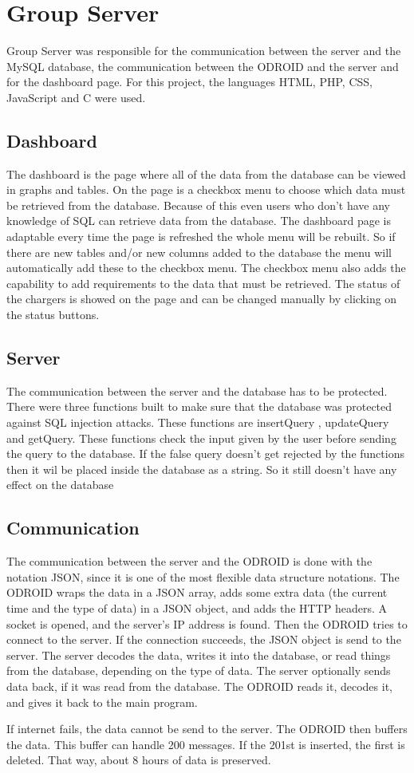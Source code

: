 \section{Group Server}\label{Server}
Group Server was responsible for the communication between the server and the MySQL database, the communication between the ODROID and the server and for the dashboard page. For this project, the languages HTML, PHP, CSS, JavaScript and C were used.
\subsection{Dashboard}
The dashboard is the page where all of the data from the database can be viewed in graphs and tables. On the page is a checkbox menu to choose which data must be retrieved from the database. Because of this even users who don’t have any knowledge of SQL can retrieve data from the database. The dashboard page is adaptable every time the page is refreshed the whole menu will be rebuilt. So if there are new tables and/or new columns added to the database the menu will automatically add these to the checkbox menu. The checkbox menu also adds the capability to add requirements to the data that must be retrieved. The status of the chargers is showed on the page and can be changed manually by clicking on the status buttons.
\subsection{Server}
The communication between the server and the database has to be protected. There were three functions built to make sure that the database was protected against SQL injection attacks. These functions are insertQuery , updateQuery and getQuery. These functions check the input given by the user before sending the query to the database. If the false query doesn't get rejected by the functions then it wil be placed inside the database as a string. So it still doesn’t have any effect on the database
\subsection{Communication}
The communication between the server and the ODROID is done with the notation JSON, since it is one of the most flexible data structure notations. The ODROID wraps the data in a JSON array, adds some extra data (the current time and the type of data) in a JSON object, and adds the HTTP headers. A socket is opened, and the server's IP address is found. Then the ODROID tries to connect to the server. If the connection succeeds, the JSON object is send to the server. The server decodes the data, writes it into the database, or read things from the database, depending on the type of data. The server optionally sends data back, if it was read from the database. The ODROID reads it, decodes it, and gives it back to the main program.

If internet fails, the data cannot be send to the server. The ODROID then buffers the data. This buffer can handle 200 messages. If the 201st is inserted, the first is deleted.
That way, about 8 hours of data is preserved.
